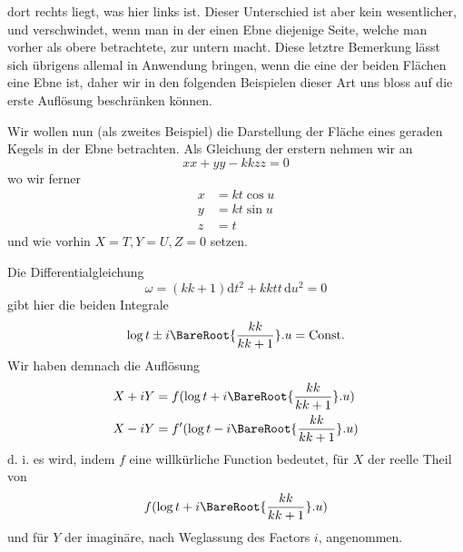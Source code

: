 dort rechts liegt, was hier links ist. Dieser Unterschied ist aber kein wesentlicher, und verschwindet, wenn man in der einen Ebne diejenige Seite, welche man vorher als obere betrachtete, zur untern macht. Diese letztre Bemerkung lässt sich übrigens allemal in Anwendung bringen, wenn die eine der beiden Flächen eine Ebne ist, daher wir in den folgenden Beispielen dieser Art uns bloss auf die erste Auflösung beschränken können.

Wir wollen nun (als zweites Beispiel) die Darstellung der Fläche eines geraden Kegels in der Ebne betrachten. Als Gleichung der erstern nehmen wir an
\[
xx+yy-kkzz=0
\]
\noindent wo wir ferner
\[
\begin{aligned}
x&=kt\cos u\\
y&=kt\sin u\\
z&=t
\end{aligned}
\]
\noindent und wie vorhin \(X=T,Y=U,Z=0\) setzen.

Die Differentialgleichung
\[
\omega=(kk+1)\mathrm{d}t^2+kktt\,\mathrm{d}u^2=0
\]
\noindent gibt hier die beiden Integrale
\[
\log t\pm i\BareRoot{\frac{kk}{kk+1}}\mathord{.}u=\text{Const.}
\]
\noindent Wir haben demnach die Auflösung
\[
\begin{aligned}
X+iY&=f(\log t+i\BareRoot{\frac{kk}{kk+1}}\mathord{.}u)\\
X-iY&=f'(\log t-i\BareRoot{\frac{kk}{kk+1}}\mathord{.}u)
\end{aligned}
\]
\noindent d. i. es wird, indem \(f\) eine willkürliche Function bedeutet, für \(X\) der reelle Theil von
\[
f(\log t+i\BareRoot{\frac{kk}{kk+1}}\mathord{.}u)
\]
\noindent und für \(Y\) der imaginäre, nach Weglassung des Factors \(i\), angenommen.
